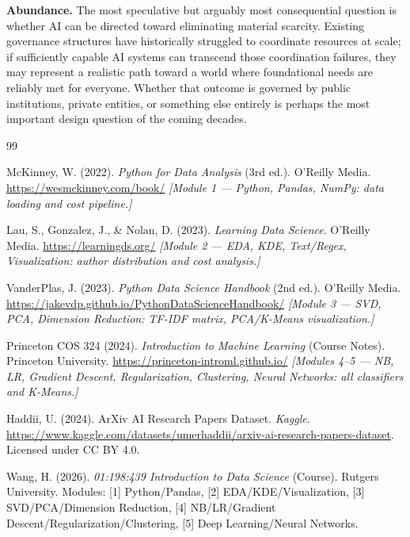 \documentclass{article}
\begin{document}
\textbf{Abundance.} The most speculative but arguably most consequential question is whether AI can be directed toward eliminating material scarcity. Existing governance structures have historically struggled to coordinate resources at scale; if sufficiently capable AI systems can transcend those coordination failures, they may represent a realistic path toward a world where foundational needs are reliably met for everyone. Whether that outcome is governed by public institutions, private entities, or something else entirely is perhaps the most important design question of the coming decades.

\clearpage

\begin{thebibliography}{99}

McKinney, W. (2022).
\textit{Python for Data Analysis} (3rd ed.).
O'Reilly Media.
\url{https://wesmckinney.com/book/}
\textit{[Module 1 — Python, Pandas, NumPy: data loading and cost pipeline.]}

Lau, S., Gonzalez, J., \& Nolan, D. (2023).
\textit{Learning Data Science}.
O'Reilly Media.
\url{https://learningds.org/}
\textit{[Module 2 — EDA, KDE, Text/Regex, Visualization: author distribution and cost analysis.]}

VanderPlas, J. (2023).
\textit{Python Data Science Handbook} (2nd ed.).
O'Reilly Media.
\url{https://jakevdp.github.io/PythonDataScienceHandbook/}
\textit{[Module 3 — SVD, PCA, Dimension Reduction: TF-IDF matrix, PCA/K-Means visualization.]}

Princeton COS 324 (2024).
\textit{Introduction to Machine Learning} (Course Notes).
Princeton University.
\url{https://princeton-introml.github.io/}
\textit{[Modules 4--5 — NB, LR, Gradient Descent, Regularization, Clustering, Neural Networks: all classifiers and K-Means.]}

Haddii, U. (2024).
ArXiv AI Research Papers Dataset.
\textit{Kaggle}.
\url{https://www.kaggle.com/datasets/umerhaddii/arxiv-ai-research-papers-dataset}.
Licensed under CC BY 4.0.

Wang, H. (2026).
\textit{01:198:439 Introduction to Data Science} (Course).
Rutgers University.
Modules: [1] Python/Pandas, [2] EDA/KDE/Visualization, [3] SVD/PCA/Dimension Reduction,
[4] NB/LR/Gradient Descent/Regularization/Clustering, [5] Deep Learning/Neural Networks.

\end{thebibliography}
\end{document}
